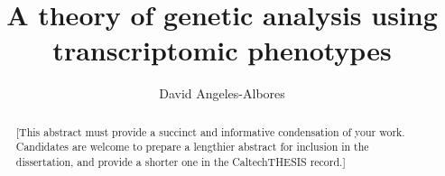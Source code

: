 \documentclass[12pt]{caltech_thesis}
\begin{document}
\title{A theory of genetic analysis using transcriptomic phenotypes}
\author{David Angeles-Albores}

\address{Pasadena, California}                     %



\maketitle[logo]

\begin{acknowledgements}
\end{acknowledgements}

\begin{abstract}
   [This abstract must provide a succinct and informative condensation of your
   work. Candidates are welcome to prepare a lengthier abstract for inclusion
   in the dissertation, and provide a shorter one in the CaltechTHESIS record.]
\end{abstract}

\begin{publishedcontent}%
\nocite{Cahn:etal:2015,Cahn:etal:2016}
\end{publishedcontent}
\end{document}
